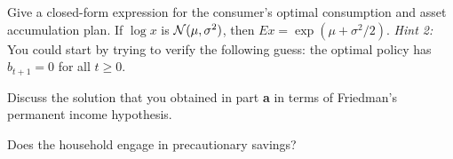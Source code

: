 \medskip
{}  Give a closed-form expression for the consumer's
optimal consumption and asset accumulation plan.
\medskip
{}  If $\log x$ is  ${\cal N}(\mu,
\sigma^2)$, then $E x = \exp(\mu+\sigma^2/2)$.
\medskip
\medskip\noindent
{\it Hint 2:}  You could start by trying
to verify the following guess:
the optimal policy has $b_{t+1} = 0$ for all $t\geq 0$.
\medskip

 Discuss the solution  that you obtained in part {\bf a}
in terms of Friedman's permanent income hypothesis.

\medskip
{}  Does the household engage in precautionary
savings?
